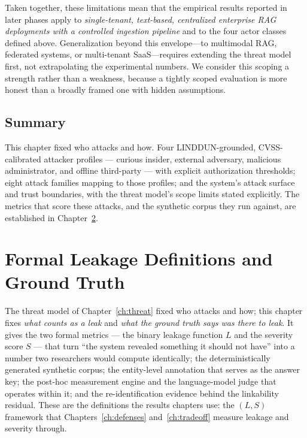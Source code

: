 Taken together, these limitations mean that the empirical results reported
in later phases apply to \emph{single-tenant, text-based, centralized
enterprise RAG deployments with a controlled ingestion pipeline} and
to the four actor classes defined above. Generalization beyond this
envelope---to multimodal RAG, federated systems, or multi-tenant SaaS---requires
extending the threat model first, not extrapolating the experimental numbers.
We consider this scoping a strength rather than a weakness, because a
tightly scoped evaluation is more honest than a broadly framed one with
hidden assumptions.



\section{Summary}
\label{sec:ch3-threat-summary}

This chapter fixed who attacks and how. Four LINDDUN-grounded, CVSS-calibrated attacker
profiles --- curious insider, external adversary, malicious administrator, and offline
third-party --- with explicit authorization thresholds; eight attack families mapping to those
profiles; and the system's attack surface and trust boundaries, with the threat model's scope
limits stated explicitly. The metrics that score these attacks, and the synthetic corpus they
run against, are established in Chapter~\ref{ch:formal}.


\chapter{Formal Leakage Definitions and Ground Truth}
\label{ch:formal}

The threat model of Chapter~\ref{ch:threat} fixed who attacks and how; this chapter fixes
\emph{what counts as a leak} and \emph{what the ground truth says was there to leak}. It gives
the two formal metrics --- the binary leakage function $L$ and the severity score $S$ --- that
turn ``the system revealed something it should not have'' into a number two researchers would
compute identically; the deterministically generated synthetic corpus; the entity-level
annotation that serves as the answer key; the post-hoc measurement engine and the language-model
judge that operates within it; and the re-identification evidence behind the linkability
residual. These are the definitions the results chapters use: the $(L,S)$ framework that
Chapters~\ref{ch:defenses} and~\ref{ch:tradeoff} measure leakage and severity through.

